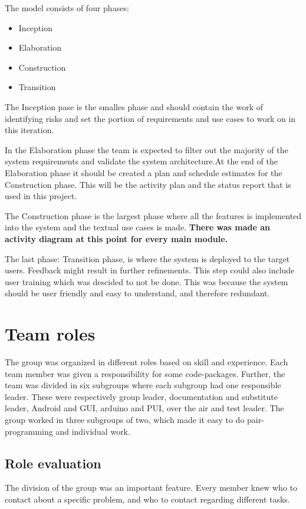 The model consists of four phases:

\begin{itemize}
\item{Inception}
\item{Elaboration}
\item{Construction}
\item{Transition}
\end{itemize}

The Inception pase is the smalles phase and should contain the work of identifying risks and set the portion of requirements and use cases to work on in this iteration.

In the Elaboration phase the team is expected to filter out the majority of the system requirements and validate the system architecture.At the end of the Elaboration phase it should be created a plan and schedule estimates for the Construction phase. This will be the activity plan and the status report that is used in this project. 

The Construction phase is the largest phase where all the features is implemented into the system and the textual use cases is made.
\textbf{There was made an activity diagram at this point for every main module.}

The last phase: Transition phase, is where the system is deployed to the target users. Feedback might result in further refinements. This step could also include user training which was descided to not be done. This was because the system should be user friendly and easy to understand, and therefore redundant.

\section{Team roles}
The group was organized in different roles based on skill and experience. Each team member was given a responsibility for some code-packages. Further, the team was divided in six subgroups where each subgroup had one responsible leader. These were respectively group leader, documentation and substitute leader, Android and GUI, arduino and PUI, over the air and test leader. The group worked in three subgroups of two, which made it easy to do pair-programming and individual work.

\subsection{Role evaluation}
The division of the group was an important feature. Every member knew who to contact about a specific problem, and who to contact regarding different tasks.\\

